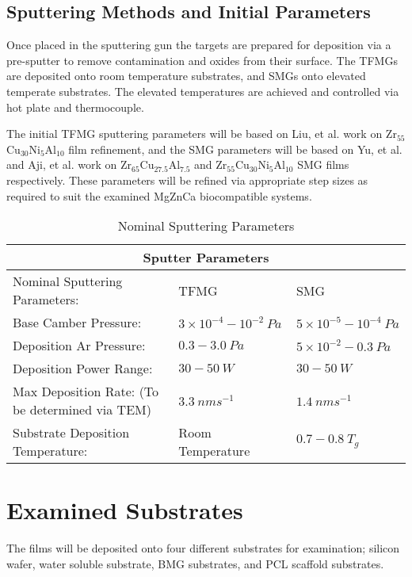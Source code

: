 \documentclass[a4paper,12pt,oneside]{report}%
\begin{document}
\subsection{Sputtering Methods and Initial Parameters}
Once placed in the sputtering gun the targets are prepared for deposition via a pre-sputter to remove contamination and oxides from their surface. The TFMGs are deposited onto room temperature substrates, and SMGs onto elevated temperate substrates. The elevated temperatures are achieved and controlled via hot plate and thermocouple.

The initial TFMG sputtering parameters will be based on Liu, et al. \cite{Liu2012} work on Zr$_{55}$Cu$_{30}$Ni$_{5}$Al$_{10}$ film refinement, and the SMG parameters will be based on Yu, et al. \cite{Yu2013} and Aji, et al. \cite{Aji2013} work on Zr$_{65}$Cu$_{27.5}$Al$_{7.5}$ and Zr$_{55}$Cu$_{30}$Ni$_{5}$Al$_{10}$ SMG films respectively. These parameters will be refined via appropriate step sizes as required to suit the examined MgZnCa biocompatible systems. 

\begin{table}[h]
	\centering
	\begin{tabular}{ l l l }
		\toprule
		\multicolumn{3}{c}{Sputter Parameters}\\
		\midrule
		Nominal Sputtering Parameters: & TFMG & SMG \\
		\midrule
		Base Camber Pressure: & $3 \times 10^{-4} - 10^{-2}~ Pa$ & $5 \times 10^{-5} - 10^{-4}~ Pa$ \\
		Deposition Ar Pressure:	& $0.3 - 3.0~ Pa$ & $5\times 10^{-2} - 0.3~ Pa$\\
		Deposition Power Range:	& $30 - 50~ W$ & $30 - 50~ W$\\
		Max Deposition Rate: (To be determined via TEM) & $3.3~ nm s^{-1}$ & $1.4~ nm s^{-1}$ \\	 
		Substrate Deposition Temperature: & Room Temperature & $0.7 - 0.8~ T_{g}$ \\
		\bottomrule
	\end{tabular}
	\caption{Nominal Sputtering Parameters}
	\label{tab:SputterParameters}
\end{table} 	

\section{Examined Substrates} 
The films will be deposited onto four different substrates for examination; silicon wafer, water soluble substrate, BMG substrates, and PCL scaffold substrates.
\end{document}
